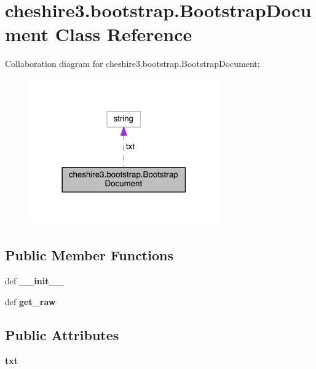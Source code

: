 \hypertarget{classcheshire3_1_1bootstrap_1_1_bootstrap_document}{\section{cheshire3.\-bootstrap.\-Bootstrap\-Document Class Reference}
\label{classcheshire3_1_1bootstrap_1_1_bootstrap_document}
}


Collaboration diagram for cheshire3.\-bootstrap.\-Bootstrap\-Document\-:
\nopagebreak
\begin{figure}[H]
\begin{center}
\leavevmode
\includegraphics[width=230pt]{classcheshire3_1_1bootstrap_1_1_bootstrap_document__coll__graph}
\end{center}
\end{figure}
\subsection*{Public Member Functions}
\begin{DoxyCompactItemize}
\item 
\hypertarget{classcheshire3_1_1bootstrap_1_1_bootstrap_document_add6b0dfd56966eac7fed0733aa4df86b}{def {\bfseries \-\_\-\-\_\-init\-\_\-\-\_\-}}\label{classcheshire3_1_1bootstrap_1_1_bootstrap_document_add6b0dfd56966eac7fed0733aa4df86b}

\item 
\hypertarget{classcheshire3_1_1bootstrap_1_1_bootstrap_document_a47462b28bbcbb9efd4181265f461d1e7}{def {\bfseries get\-\_\-raw}}\label{classcheshire3_1_1bootstrap_1_1_bootstrap_document_a47462b28bbcbb9efd4181265f461d1e7}

\end{DoxyCompactItemize}
\subsection*{Public Attributes}
\begin{DoxyCompactItemize}
\item 
\hypertarget{classcheshire3_1_1bootstrap_1_1_bootstrap_document_ae4a136e9e10a3e72fdff9434de39cb61}{{\bfseries txt}}\label{classcheshire3_1_1bootstrap_1_1_bootstrap_document_ae4a136e9e10a3e72fdff9434de39cb61}

\end{DoxyCompactItemize}
